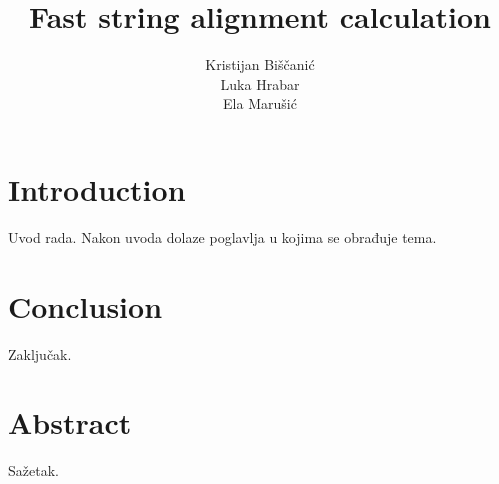 \documentclass[times, utf8, seminar]{fer}
\begin{document}
\title{Fast string alignment calculation}

\author{Kristijan Biščanić \\ Luka Hrabar \\ Ela Marušić}

\maketitle

\tableofcontents

\chapter{Introduction}
Uvod rada. Nakon uvoda dolaze poglavlja u kojima se obrađuje tema.

\chapter{Conclusion}
Zaključak.




\chapter{Abstract}
Sažetak.

\nocite{*}
\end{document}

